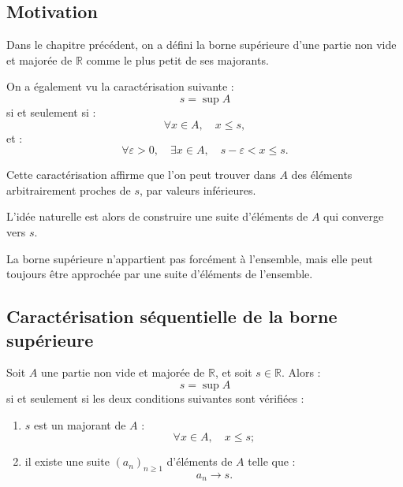 \documentclass[11pt,a4paper]{article}
\newcommand{\R}{\mathbb R}
\begin{document}
\subsection{Motivation}

Dans le chapitre précédent, on a défini la borne supérieure d'une partie non vide et majorée de \(\R\) comme le plus petit de ses majorants.

On a également vu la caractérisation suivante :
\[
s=\sup A
\]
si et seulement si :
\[
\forall x\in A,\quad x\leq s,
\]
et :
\[
\forall \varepsilon>0,\quad \exists x\in A,\quad s-\varepsilon<x\leq s.
\]

Cette caractérisation affirme que l'on peut trouver dans \(A\) des éléments arbitrairement proches de \(s\), par valeurs inférieures.

L'idée naturelle est alors de construire une suite d'éléments de \(A\) qui converge vers \(s\).

\begin{retenirbox}
La borne supérieure n'appartient pas forcément à l'ensemble, mais elle peut toujours être approchée par une suite d'éléments de l'ensemble.
\end{retenirbox}

\subsection{Caractérisation séquentielle de la borne supérieure}

\begin{theorembox}
Soit \(A\) une partie non vide et majorée de \(\R\), et soit \(s\in\R\).  
Alors :
\[
s=\sup A
\]
si et seulement si les deux conditions suivantes sont vérifiées :
\begin{enumerate}
    \item \(s\) est un majorant de \(A\) :
    \[
    \forall x\in A,\quad x\leq s ;
    \]
    \item il existe une suite \((a_n)_{n\geq1}\) d'éléments de \(A\) telle que :
    \[
    a_n\longrightarrow s.
    \]
\end{enumerate}
\end{theorembox}
\end{document}
